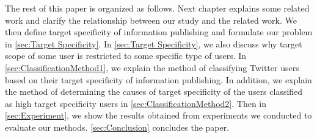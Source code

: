 The rest of this paper is organized as follows.  Next chapter explains
some related work and clarify the relationship between our study and
the related work.
We then define target specificity of information publishing and
formulate our problem in \ref{sec:Target Specificity}. In
\ref{sec:Target Specificity}, we also discuss why target scope of some
user is restricted to some specific type of users.  In
\ref{sec:ClassificationMethod1}, we explain the method of classifying
Twitter users based on their target specificity of information
publishing.  In addition, we explain the method of determining the
causes of target specificity of the users classified as high target
specificity users in \ref{sec:ClassificationMethod2}.  Then in \ref{sec:Experiment},
we show the results obtained from experiments we conducted to
evaluate our methods.  \ref{sec:Conclusion} concludes the paper.
